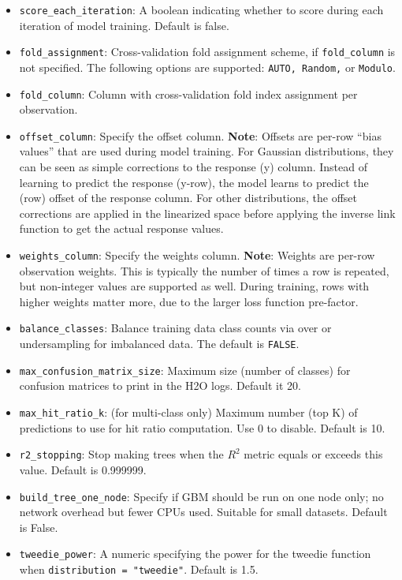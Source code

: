 \begin{itemize}
\item {\texttt{score\_each\_iteration}}: A boolean indicating whether to score during each iteration of model training.  Default is false.
\item \texttt{fold\_assignment}: Cross-validation fold assignment scheme, if \texttt{fold\_column} is not specified. The following options are supported: \texttt{AUTO, Random,} or \texttt{Modulo}. 
\item \texttt{fold\_column}:  Column with cross-validation fold index assignment per observation. 
\item \texttt{offset\_column}: Specify the offset column. {\textbf{Note}}: Offsets are per-row “bias values” that are used during model training. For Gaussian distributions, they can be seen as simple corrections to the response (y) column. Instead of learning to predict the response (y-row), the model learns to predict the (row) offset of the response column. For other distributions, the offset corrections are applied in the linearized space before applying the inverse link function to get the actual response values. 
\item \texttt{weights\_column}: Specify the weights column. {\textbf{Note}}: Weights are per-row observation weights. This is typically the number of times a row is repeated, but non-integer values are supported as well. During training, rows with higher weights matter more, due to the larger loss function pre-factor.
\item {\texttt{balance\_classes}}: Balance training data class counts via over or undersampling for imbalanced data. The default is {\texttt{FALSE}}.
\item {\texttt{max\_confusion\_matrix\_size}}: Maximum size (number of classes) for confusion matrices to print in the H2O logs.  Default it 20.
\item {\texttt{max\_hit\_ratio\_k}}: (for multi-class only) Maximum number (top K) of predictions to use for hit ratio computation.  Use 0 to disable.  Default is 10.
\item {\texttt{r2\_stopping}}: Stop making trees when the $R^2$ metric equals or exceeds this value.  Default is 0.999999.
\item {\texttt{build\_tree\_one\_node}}: Specify if GBM should be run on one node only; no network overhead but fewer CPUs used. Suitable for small datasets.  Default is False.
\item {\texttt{tweedie\_power}}: A numeric specifying the power for the tweedie function when \texttt{distribution = "tweedie"}.  Default is 1.5.

\end{itemize}
